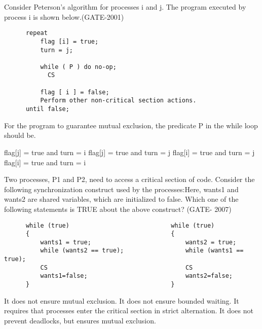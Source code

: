 
\begin{minipage}{\linewidth}

  \question  Consider Peterson’s algorithm for processes i and j. The program executed by process i is shown below.(GATE-2001)

  \begin{lstlisting}
      repeat
          flag [i] = true;
          turn = j;

          while ( P ) do no-op;
            CS

          flag [ i ] = false;
          Perform other non-critical section actions.
      until false;
  \end{lstlisting}
  For the program to guarantee mutual exclusion, the predicate P in the while loop should be.
  \begin{choices}
    \choice flag[j] = true and turn = i
    \choice flag[j] = true and turn = j
    \choice flag[i] = true and turn = j
    \choice flag[i] = true and turn = i
  \end{choices}

  \end{minipage}

\vspace{0.08in}


\begin{minipage}{\linewidth}

  \question  Two processes, P1 and P2, need to access a critical section of code. Consider the following synchronization construct used by the processes:Here, wants1 and wants2 are shared variables, which are initialized to false. Which one of the following statements is TRUE about the above construct? (GATE- 2007)

  \begin{lstlisting}
      while (true)                            while (true)
      {                                       {
          wants1 = true;                          wants2 = true;
          while (wants2 == true);                 while (wants1 == true);
          CS                                      CS
          wants1=false;                           wants2=false;
      }                                       }
  \end{lstlisting}

  \begin{choices}
    \choice  It does not ensure mutual exclusion.
    \choice  It does not ensure bounded waiting.
    \choice  It requires that processes enter the critical section in strict alternation.
    \choice  It does not prevent deadlocks, but ensures mutual exclusion.
  \end{choices}

  \end{minipage}

